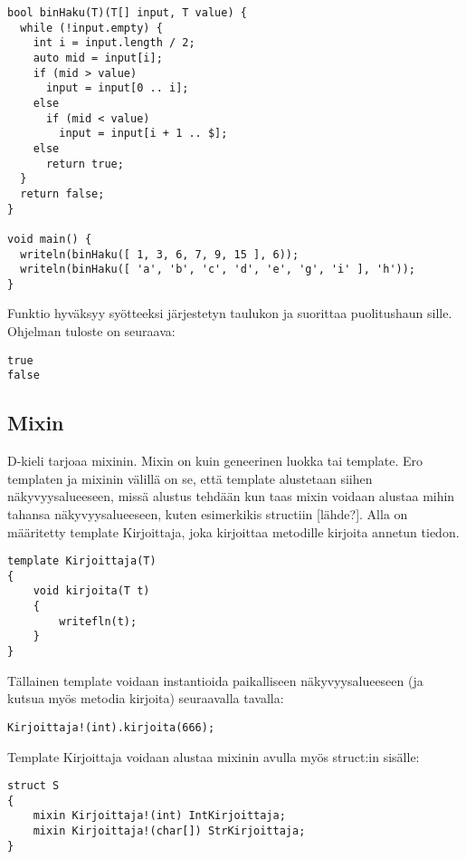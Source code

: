 \documentclass[11pt,oneside,a4paper]{article}
\begin{document}
\begin{verbatim}
bool binHaku(T)(T[] input, T value) {
  while (!input.empty) {
    int i = input.length / 2;
    auto mid = input[i];
    if (mid > value)
      input = input[0 .. i];
    else 
      if (mid < value)
        input = input[i + 1 .. $];
    else 
      return true;
  }
  return false;
}

void main() {
  writeln(binHaku([ 1, 3, 6, 7, 9, 15 ], 6));
  writeln(binHaku([ 'a', 'b', 'c', 'd', 'e', 'g', 'i' ], 'h'));
}
\end{verbatim}

Funktio hyväksyy syötteeksi järjestetyn taulukon ja suorittaa puolitushaun
sille. Ohjelman tuloste on seuraava:
\begin{verbatim}
true
false
\end{verbatim}

\subsection{Mixin}
D-kieli tarjoaa mixinin. Mixin on kuin geneerinen luokka tai template. Ero
templaten ja mixinin välillä on se, että template alustetaan siihen
näkyvyysalueeseen, missä  alustus tehdään kun taas mixin voidaan alustaa mihin
tahansa näkyvyysalueeseen, kuten esimerkikis structiin [lähde?]. Alla on
määritetty template Kirjoittaja, joka kirjoittaa metodille kirjoita annetun
tiedon. 
\begin{verbatim}
template Kirjoittaja(T)
{
    void kirjoita(T t)
    {
        writefln(t);
    }
}
\end{verbatim}
Tällainen template voidaan instantioida paikalliseen näkyvyysalueeseen (ja
kutsua myös metodia kirjoita) seuraavalla tavalla:
\begin{verbatim}
Kirjoittaja!(int).kirjoita(666); 
\end{verbatim}
Template Kirjoittaja voidaan alustaa mixinin avulla myös struct:in sisälle:
\begin{verbatim}
struct S
{
    mixin Kirjoittaja!(int) IntKirjoittaja;
    mixin Kirjoittaja!(char[]) StrKirjoittaja;
} 
\end{verbatim}
\end{document}
